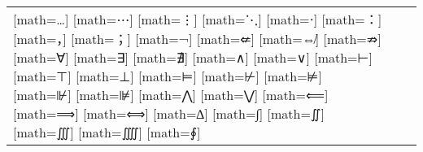 \documentclass{unittest}
\begin{document}
\begin{tabular}{lcc}
\makerow{…}[math=…]
\makerow{⋯}[math=⋯]
\makerow{⋮}[math=⋮]
\makerow{⋱}[math=⋱]
\makerow{⋅}[math=⋅]
\makerow{：}[math=：]
\makerow{，}[math=，]
\makerow{；}[math=；]
\midrule%
\makerow{¬}[math=¬]
\makerow{⇍}[math=⇍]
\makerow{⇎}[math=⇎]
\makerow{⇏}[math=⇏]
\makerow{∀}[math=∀]
\makerow{∃}[math=∃]
\makerow{∄}[math=∄]
\makerow{∧}[math=∧]
\makerow{∨}[math=∨]
\makerow{⊢}[math=⊢]
\makerow{⊤}[math=⊤]
\makerow{⊥}[math=⊥]
\makerow{⊨}[math=⊨]
\makerow{⊬}[math=⊬]
\makerow{⊭}[math=⊭]
\makerow{⊮}[math=⊮]
\makerow{⊯}[math=⊯]
\makerow{⋀}[math=⋀]
\makerow{⋁}[math=⋁]
\makerow{⟸}[math=⟸]
\makerow{⟹}[math=⟹]
\makerow{⟺}[math=⟺]
\midrule%
\makerow{∆}[math=∆]
\makerow{∫}[math=∫]
\makerow{∬}[math=∬]
\makerow{∭}[math=∭]
\makerow{⨌}[math=⨌]
\makerow{∮}[math=∮]
\bottomrule
\end{tabular}
\end{document}
